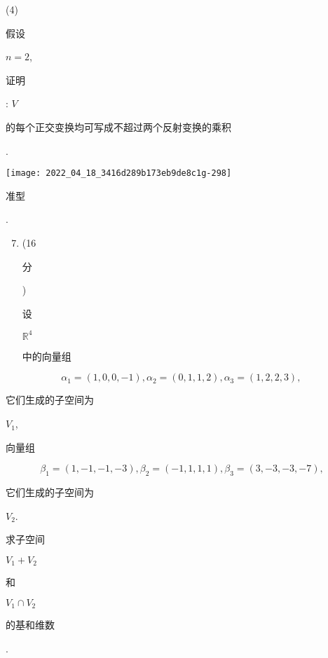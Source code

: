 \documentclass[10pt]{article}
\begin{document}
(4) \begin{CJK}{UTF8}{mj}假设\end{CJK} $n=2$, \begin{CJK}{UTF8}{mj}证明\end{CJK}: $V$ \begin{CJK}{UTF8}{mj}的每个正交变换均可写成不超过两个反射变换的乘积\end{CJK}.

\texttt{[image: 2022\_04\_18\_3416d289b173eb9de8c1g-298]}

\begin{CJK}{UTF8}{mj}准型\end{CJK}.

\begin{enumerate}
  \setcounter{enumi}{6}
  \item (16 \begin{CJK}{UTF8}{mj}分\end{CJK}) \begin{CJK}{UTF8}{mj}设\end{CJK} $\mathbb{R}^{4}$ \begin{CJK}{UTF8}{mj}中的向量组\end{CJK}
\end{enumerate}
$$
\alpha_{1}=(1,0,0,-1), \alpha_{2}=(0,1,1,2), \alpha_{3}=(1,2,2,3) \text {, }
$$
\begin{CJK}{UTF8}{mj}它们生成的子空间为\end{CJK} $V_{1}$, \begin{CJK}{UTF8}{mj}向量组\end{CJK}
$$
\beta_{1}=(1,-1,-1,-3), \beta_{2}=(-1,1,1,1), \beta_{3}=(3,-3,-3,-7),
$$
\begin{CJK}{UTF8}{mj}它们生成的子空间为\end{CJK} $V_{2}$. \begin{CJK}{UTF8}{mj}求子空间\end{CJK} $V_{1}+V_{2}$ \begin{CJK}{UTF8}{mj}和\end{CJK} $V_{1} \cap V_{2}$ \begin{CJK}{UTF8}{mj}的基和维数\end{CJK}.
\end{document}
